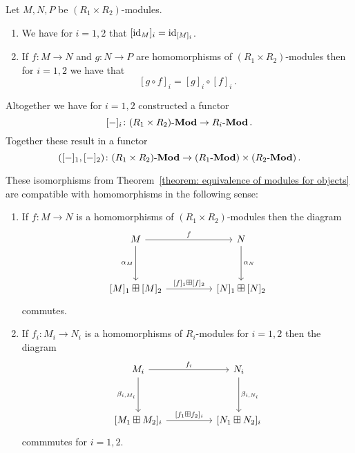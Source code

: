 \begin{lemma}
  Let $M, N, P$ be $(R_1 \times R_2)$-modules.
  \begin{enumerate}
    \item
      We have for $i = 1, 2$ that $[\operatorname{id}_M]_i = \operatorname{id}_{[M]_i}$.
    \item
      If $f \colon M \to N$ and $g \colon N \to P$ are homomorphisms of $(R_1 \times R_2)$-modules then for $i = 1, 2$ we have that
      \[
          [g \circ f]_i
        = [g]_i \circ [f]_i \,.
      \]
  \end{enumerate}
\end{lemma}




\begin{remark}
  \label{remark: functor into product}
  Altogether we have for $i = 1, 2$ constructed a functor
  \[
            [-]_i
    \colon  (R_1 \times R_2)\text{-}\mathbf{Mod}
    \to     R_i\text{-}\mathbf{Mod} \,.
  \]
  Together these result in a functor
  \[
            ([-]_1, [-]_2)
    \colon  (R_1 \times R_2)\text{-}\mathbf{Mod}
    \to     (R_1\text{-}\mathbf{Mod}) \times (R_2\text{-}\mathbf{Mod}) \,.
  \]
\end{remark}


\begin{theorem}
  \label{theorem: equivalence of modules for morphisms}
  These isomorphisms from Theorem~\ref{theorem: equivalence of modules for objects} are compatible with homomorphisms in the following sense:
  \begin{enumerate}
    \item
      If $f \colon M \to N$ is a homomorphisms of $(R_1 \times R_2)$-modules then the diagram
      \[
        \begin{tikzcd}[sep = huge]
            M
            \arrow{r}[above]{f}
            \arrow{d}[left]{\alpha_M}
          & N
            \arrow{d}[right]{\alpha_N}
          \\
            {[M]_1} \boxplus {[M]_2}
            \arrow{r}[above]{{[f]_1} \boxplus {[f]_2}}
          & {[N]_1} \boxplus {[N]_2}
        \end{tikzcd}
      \]
      commutes.
    \item
      If $f_i \colon M_i \to N_i$ is a homomorphisms of $R_i$-modules for $i = 1, 2$ then the diagram
      \[
        \begin{tikzcd}[sep = huge]
            M_i
            \arrow{r}[above]{f_i}
            \arrow{d}[left]{\beta_{i, M_i}}
          & N_i
            \arrow{d}[right]{\beta_{i, N_i}}
          \\
            {[M_1 \boxplus M_2]_i}
            \arrow{r}[above]{{[f_1 \boxplus f_2]_i}}
          & {[N_1 \boxplus N_2]_i}
        \end{tikzcd}
      \]
      commmutes for $i = 1, 2$.
  \end{enumerate}
\end{theorem}



